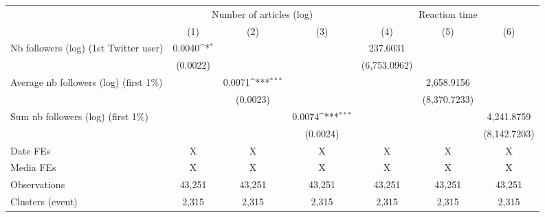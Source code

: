 {
\def\sym#1{\ifmmode^{#1}\else\(^{#1}\)\fi}
\begin{tabular}{l*{6}{c}}
\hline\hline
                    &\multicolumn{3}{c}{Number of articles (log)}                     &\multicolumn{3}{c}{Reaction time}                                \\\cmidrule(lr){2-4}\cmidrule(lr){5-7}
                    &\multicolumn{1}{c}{(1)}         &\multicolumn{1}{c}{(2)}         &\multicolumn{1}{c}{(3)}         &\multicolumn{1}{c}{(4)}         &\multicolumn{1}{c}{(5)}         &\multicolumn{1}{c}{(6)}         \\
\hline
Nb followers (log) (1st Twitter user)&      0.0040\sym{*}  &                     &                     &    237.6031         &                     &                     \\
                    &    (0.0022)         &                     &                     &(6,753.0962)         &                     &                     \\
Average nb followers (log) (first 1$\%$)&                     &      0.0071\sym{***}&                     &                     &  2,658.9156         &                     \\
                    &                     &    (0.0023)         &                     &                     &(8,370.7233)         &                     \\
Sum nb followers (log) (first 1$\%$)&                     &                     &      0.0074\sym{***}&                     &                     &  4,241.8759         \\
                    &                     &                     &    (0.0024)         &                     &                     &(8,142.7203)         \\
\hline
Date FEs            &           X         &           X         &           X         &           X         &           X         &           X         \\
Media FEs           &           X         &           X         &           X         &           X         &           X         &           X         \\
Observations        &      43,251         &      43,251         &      43,251         &      43,251         &      43,251         &      43,251         \\
Clusters (event)    &       2,315         &       2,315         &       2,315         &       2,315         &       2,315         &       2,315         \\
\hline\hline
\end{tabular}
}
